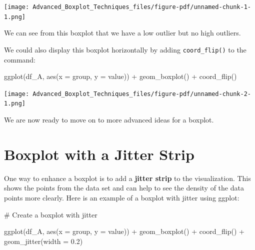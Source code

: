 \documentclass[
  letterpaper,
  DIV=11,
  numbers=noendperiod]{scrreprt}
\newenvironment{Shaded}{\begin{snugshade}}{\end{snugshade}}
\newcommand{\AttributeTok}[1]{\textcolor[rgb]{0.40,0.45,0.13}{#1}}
\newcommand{\CommentTok}[1]{\textcolor[rgb]{0.37,0.37,0.37}{#1}}
\newcommand{\FloatTok}[1]{\textcolor[rgb]{0.68,0.00,0.00}{#1}}
\newcommand{\FunctionTok}[1]{\textcolor[rgb]{0.28,0.35,0.67}{#1}}
\newcommand{\NormalTok}[1]{\textcolor[rgb]{0.00,0.23,0.31}{#1}}
\newcommand{\SpecialCharTok}[1]{\textcolor[rgb]{0.37,0.37,0.37}{#1}}
\begin{document}
\begin{center}
\texttt{[image: Advanced\_Boxplot\_Techniques\_files/figure-pdf/unnamed-chunk-1-1.png]}
\end{center}

We can see from this boxplot that we have a low outlier but no high
outliers.

We could also display this boxplot horizontally by adding
\texttt{coord\_flip()} to the command:

\begin{Shaded}
\begin{Highlighting}[]
\FunctionTok{ggplot}\NormalTok{(df\_A, }\FunctionTok{aes}\NormalTok{(}\AttributeTok{x =}\NormalTok{ group, }\AttributeTok{y =}\NormalTok{ value)) }\SpecialCharTok{+}
  \FunctionTok{geom\_boxplot}\NormalTok{() }\SpecialCharTok{+}
  \FunctionTok{coord\_flip}\NormalTok{()}
\end{Highlighting}
\end{Shaded}

\begin{center}
\texttt{[image: Advanced\_Boxplot\_Techniques\_files/figure-pdf/unnamed-chunk-2-1.png]}
\end{center}

We are now ready to move on to more advanced ideas for a boxplot.

\section*{Boxplot with a Jitter
Strip}\label{boxplot-with-a-jitter-strip}


One way to enhance a boxplot is to add a \textbf{jitter strip} to the
visualization. This shows the points from the data set and can help to
see the density of the data points more clearly. Here is an example of a
boxplot with jitter using ggplot:

\begin{Shaded}
\begin{Highlighting}[]
\CommentTok{\# Create a boxplot with jitter}

\FunctionTok{ggplot}\NormalTok{(df\_A, }\FunctionTok{aes}\NormalTok{(}\AttributeTok{x =}\NormalTok{ group, }\AttributeTok{y =}\NormalTok{ value)) }\SpecialCharTok{+}
  \FunctionTok{geom\_boxplot}\NormalTok{() }\SpecialCharTok{+}
  \FunctionTok{coord\_flip}\NormalTok{() }\SpecialCharTok{+}
  \FunctionTok{geom\_jitter}\NormalTok{(}\AttributeTok{width =} \FloatTok{0.2}\NormalTok{)}
\end{Highlighting}
\end{Shaded}
\end{document}
